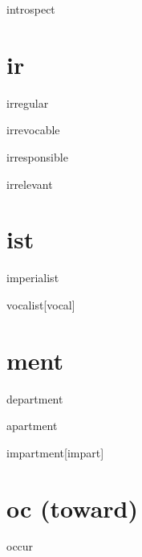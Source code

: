 \begin{RefWord}{introspect}
\end{RefWord}

\section{ir} 

\begin{RefWord}{irregular}
\end{RefWord}

\begin{RefWord}{irrevocable}
\end{RefWord}

\begin{DefWord}{irresponsible}
\end{DefWord}

\begin{RefWord}{irrelevant}
\end{RefWord}

\section{ist}

\begin{RefWord}{imperialist}
\end{RefWord}

\begin{RefWord}{vocalist}[vocal]
\end{RefWord}

\section{ment}

\begin{RefWord}{department}
\end{RefWord}

\begin{RefWord}{apartment}
\end{RefWord}

\begin{RefWord}{impartment}[impart]
\end{RefWord}


\section{oc (toward)}

\begin{RefWord}{occur}
\end{RefWord}

